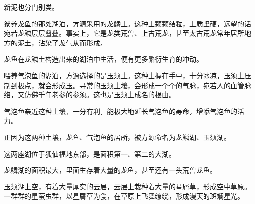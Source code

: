 \begin{this_body}
新泥也分门别类。

豢养龙鱼的那处湖泊，方源采用的龙鳞土。这种土颗颗结粒，土质坚硬，远望的话宛若龙鳞层层叠叠。事实上，它是龙类荒兽、上古荒龙，甚至太古荒龙常年居所地方的泥土，沾染了龙气从而形成。

龙鱼在龙鳞土构造出来的湖泊中生活，便有更多繁衍生育的冲动。

喂养气泡鱼的湖泊，方源选择的是玉须土。这种土握在手中，十分冰凉，玉须土压制到极点，就会形成玉。寻常的玉须土壤，会形成一个个的气脉，宛若人的血管脉络，又仿佛千年老参的参须。这也是玉须土成名的根由。

气泡鱼亲近这种土壤，十分有利，能极大地延长气泡鱼的寿命，增添气泡鱼的活力。

正因为这两种土壤，龙鱼、气泡鱼的居所，被方源命名为龙鳞湖、玉须湖。

这两座湖位于狐仙福地东部，是面积第一、第二的大湖。

龙鳞湖的面积最大，里面生存着大量的龙鱼，甚至还有一头荒兽龙鱼。

玉须湖上空，有着大量厚实的云层，云层上栽种着大量的星屑草，形成空中草原。一群群的星萤虫群，以星屑草为食，在草原上飞舞缭绕，形成漫天的斑斓星光。

\end{this_body}

